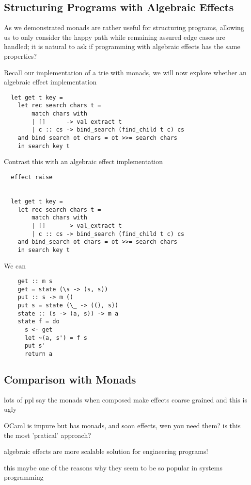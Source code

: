 \subsection{Structuring Programs with Algebraic Effects}
As we demonstrated monads are rather useful for structuring programs,
allowing us to only consider the happy path while remaining assured
edge cases are handled;
it is natural to ask if programming with algebraic effects
has the same properties?

Recall our implementation of a trie with monads,
we will now explore whether an algebraic effect implementation
\begin{verbatim}
  let get t key =
    let rec search chars t =
        match chars with
        | []      -> val_extract t
        | c :: cs -> bind_search (find_child t c) cs
    and bind_search ot chars = ot >>= search chars
    in search key t
\end{verbatim}

Contrast this with an algebraic effect implementation

\begin{verbatim}
  effect raise


  let get t key =
    let rec search chars t =
        match chars with
        | []      -> val_extract t
        | c :: cs -> bind_search (find_child t c) cs
    and bind_search ot chars = ot >>= search chars
    in search key t

\end{verbatim}

We can 

\begin{verbatim}
    get :: m s
    get = state (\s -> (s, s))
    put :: s -> m ()
    put s = state (\_ -> ((), s))
    state :: (s -> (a, s)) -> m a
    state f = do
      s <- get
      let ~(a, s') = f s
      put s'
      return a
\end{verbatim}

\subsection{Comparison with Monads}
lots of ppl say the monads when composed make effects coarse grained
and this is ugly

OCaml is impure but has monads, and soon effects, wen you need them?
is this the most 'pratical' approach?

algebraic effects are more scalable solution for engineering programs!

this maybe one of the reasons why they seem to be so popular in systems
programming

